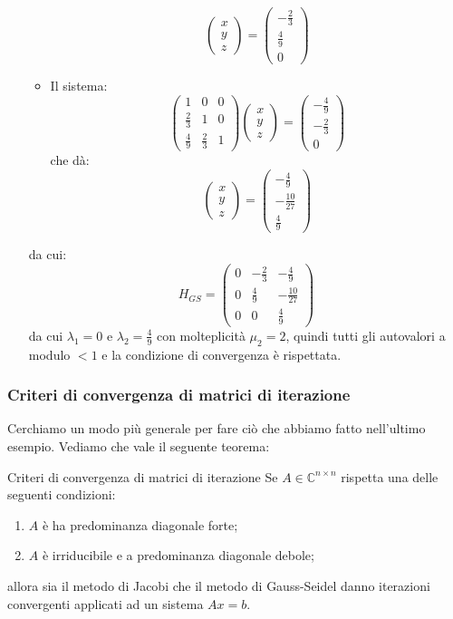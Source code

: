 \documentclass[a4paper,11pt]{article}
\begin{document}
\begin{itemize}
\begin{itemize}
$$\begin{pmatrix}
	x \\ y \\ z
\end{pmatrix} = 
\begin{pmatrix}
	-\frac{2}{3} \\ \frac{4}{9} \\ 0
\end{pmatrix}
$$
	\item Il sistema:
$$
\begin{pmatrix}
	1 & 0 & 0 \\ 
	\frac{2}{3} & 1 & 0 \\ 
	\frac{4}{9} & \frac{2}{3} & 1
\end{pmatrix}
\begin{pmatrix}
	x \\ y \\ z
\end{pmatrix} =
\begin{pmatrix}
	-\frac{4}{9} \\ -\frac{2}{3} \\ 0
\end{pmatrix}
$$
che dà:
$$
\begin{pmatrix}
	x \\ y \\ z
\end{pmatrix} = 
\begin{pmatrix}
	-\frac{4}{9} \\ -\frac{10}{27} \\ \frac{4}{9}
\end{pmatrix}
$$
\end{itemize}
da cui:
$$
H_{GS} = \begin{pmatrix}
	0 & -\frac{2}{3} & -\frac{4}{9} \\ 
	0 & \frac{4}{9} & -\frac{10}{27} \\ 
	0 & 0 & \frac{4}{9}
\end{pmatrix}
$$
da cui $\lambda_1 = 0$ e $\lambda_2 = \frac{4}{9}$ con molteplicità $\mu_2 = 2$, quindi tutti gli autovalori a modulo $< 1$ e la condizione di convergenza è rispettata.
\end{itemize}

\subsubsection{Criteri di convergenza di matrici di iterazione}
Cerchiamo un modo più generale per fare ciò che abbiamo fatto nell'ultimo esempio.
Vediamo che vale il seguente teorema:
\begin{theorem}{Criteri di convergenza di matrici di iterazione}
	Se $A \in \mathbb{C}^{n \times n}$ rispetta una delle seguenti condizioni:
	\begin{enumerate}
		\item $A$ è ha predominanza diagonale forte;
		\item $A$ è irriducibile e a predominanza diagonale debole;
	\end{enumerate}
	allora sia il metodo di Jacobi che il metodo di Gauss-Seidel danno iterazioni convergenti applicati ad un sistema $Ax = b$. 
\end{theorem}
\end{document}
